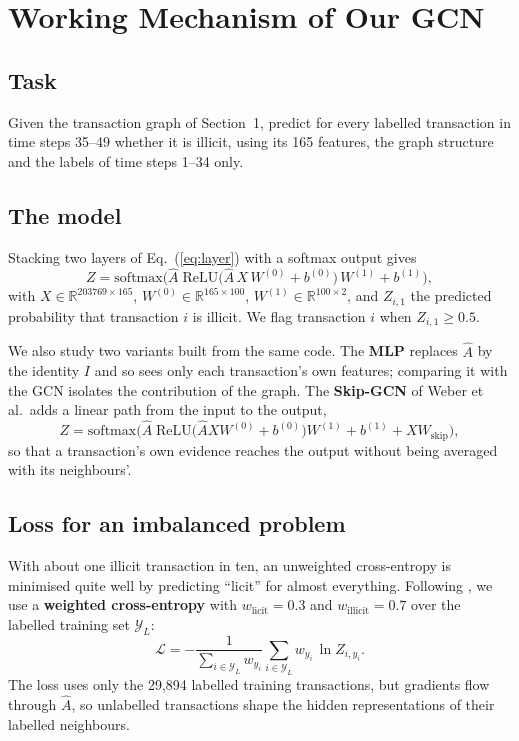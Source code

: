 \documentclass[11pt,a4paper]{article}
\newcommand{\Ahat}{\hat{A}}
\begin{document}
\section{Working Mechanism of Our GCN}
\subsection{Task}
Given the transaction graph of Section~1, predict for every labelled transaction in time steps 35--49 whether it is illicit, using
its 165 features, the graph structure and the labels of time steps 1--34 only.

\subsection{The model}
Stacking two layers of Eq.~(\ref{eq:layer}) with a softmax output gives
\begin{equation}
  Z = \mathrm{softmax}\!\Big(\Ahat\;\mathrm{ReLU}\big(\Ahat\,X\,W^{(0)} + b^{(0)}\big)\,W^{(1)} + b^{(1)}\Big),
  \label{eq:model}
\end{equation}
with $X\in\mathbb{R}^{203769\times165}$, $W^{(0)}\in\mathbb{R}^{165\times100}$, $W^{(1)}\in\mathbb{R}^{100\times2}$, and $Z_{i,1}$ the
predicted probability that transaction $i$ is illicit. We flag transaction $i$ when $Z_{i,1}\ge 0.5$.

We also study two variants built from the same code. The \textbf{MLP} replaces $\Ahat$ by the identity $I$ and so sees only each
transaction's own features; comparing it with the GCN isolates the contribution of the graph. The \textbf{Skip-GCN} of Weber et al.\
adds a linear path from the input to the output,
\begin{equation}
  Z = \mathrm{softmax}\!\Big(\Ahat\;\mathrm{ReLU}\big(\Ahat X W^{(0)}+b^{(0)}\big)W^{(1)} + b^{(1)} + X W_{\text{skip}}\Big),
  \label{eq:skip}
\end{equation}
so that a transaction's own evidence reaches the output without being averaged with its neighbours'.

\subsection{Loss for an imbalanced problem}
With about one illicit transaction in ten, an unweighted cross-entropy is minimised quite well by predicting ``licit'' for almost
everything. Following \cite{weber}, we use a \textbf{weighted cross-entropy} with $w_{\text{licit}}=0.3$ and $w_{\text{illicit}}=0.7$
over the labelled training set $\mathcal Y_L$:
\begin{equation}
  \mathcal L = -\frac{1}{\sum_{i\in\mathcal Y_L} w_{y_i}} \sum_{i\in\mathcal Y_L} w_{y_i}\,\ln Z_{i,y_i}.
  \label{eq:loss}
\end{equation}
The loss uses only the 29,894 labelled training transactions, but gradients flow through $\Ahat$, so unlabelled transactions shape
the hidden representations of their labelled neighbours.
\end{document}

